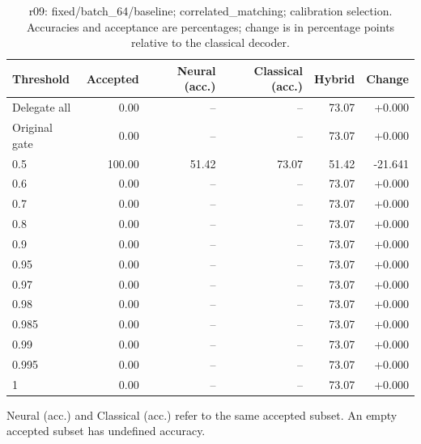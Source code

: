 \begin{table}[htbp]
\centering\small
\setlength{\tabcolsep}{3pt}
\caption{r09: fixed/batch\_64/baseline; correlated\_matching; calibration selection. Accuracies and acceptance are percentages; change is in percentage points relative to the classical decoder.}
\begin{tabular}{lrrrrr}
\toprule
Threshold & Accepted & Neural (acc.) & Classical (acc.) & Hybrid & Change \\
\midrule
Delegate all & 0.00 & -- & -- & 73.07 & +0.000 \\
Original gate & 0.00 & -- & -- & 73.07 & +0.000 \\
0.5 & 100.00 & 51.42 & 73.07 & 51.42 & -21.641 \\
0.6 & 0.00 & -- & -- & 73.07 & +0.000 \\
0.7 & 0.00 & -- & -- & 73.07 & +0.000 \\
0.8 & 0.00 & -- & -- & 73.07 & +0.000 \\
0.9 & 0.00 & -- & -- & 73.07 & +0.000 \\
0.95 & 0.00 & -- & -- & 73.07 & +0.000 \\
0.97 & 0.00 & -- & -- & 73.07 & +0.000 \\
0.98 & 0.00 & -- & -- & 73.07 & +0.000 \\
0.985 & 0.00 & -- & -- & 73.07 & +0.000 \\
0.99 & 0.00 & -- & -- & 73.07 & +0.000 \\
0.995 & 0.00 & -- & -- & 73.07 & +0.000 \\
1 & 0.00 & -- & -- & 73.07 & +0.000 \\
\bottomrule
\end{tabular}
\par\smallskip\footnotesize Neural (acc.) and Classical (acc.) refer to the same accepted subset. An empty accepted subset has undefined accuracy.
\end{table}

